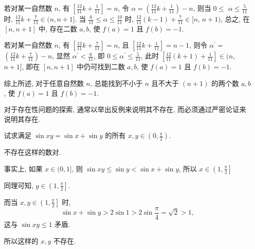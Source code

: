 \begin{solution}
	若对某一自然数 $n$, 有 $\left[\frac{12}{11} k+\frac{1}{11}\right]=n$, 令 $\alpha=\left(\frac{12}{11} k+\frac{1}{11}\right)-n$, 则当 $0 \leqslant$ $\alpha \leqslant \frac{5}{11}$ 时, $\frac{12}{11} k+\frac{7}{11} \in(n, n+1]$. 当 $\frac{6}{11} \leqslant \alpha \leqslant \frac{10}{11}$ 时, $\frac{12}{11}(k-1)+\frac{7}{11} \in[n$, $n+1)$, 总之, 在 $[n, n+1]$ 中, 存在二数 $a ,  b$, 使 $f(a)=1$ 且 $f(b)=-1$.

	若对某一自然数 $n$, 有 $\left[\frac{12}{11} k+\frac{7}{11}\right]=n$, 且 $\left[\frac{12}{11} k+\frac{1}{11}\right]=n-1$, 则令 $\alpha^{\prime}=$ $\left(\frac{12}{11} k+\frac{7}{11}\right)-n$, 显然 $\alpha^{\prime}<\frac{6}{11}$, 即 $0 \leqslant \alpha^{\prime} \leqslant \frac{5}{11}$, 此时 $\left[\frac{12}{11}(k+1)+\frac{1}{11}\right] \in(n$, $n+1]$, 即在 $[n, n+1]$ 中仍可找到二数 $a ,  b$, 使 $f(a)=1$ 且 $f(b)=-1$.

	综上所述, 对于任意自然数 $n$, 总能找到不小于 $n$ 且不大于 $(n+1)$ 的两个数 $a ,  b$, 使 $f(a)=1$ 且 $f(b)=-1$.
\end{solution}
\begin{note}
	对于存在性问题的探索, 通常以举出反例来说明其不存在, 而必须通过严密论证来说明其存在.
\end{note}

\begin{example}
	试求满足 $\sin x y=\sin x+\sin y$ 的所有 $x, y \in\left(0, \frac{\pi}{2}\right)$.
\end{example}
\begin{solution}
	不存在这样的数对.

	事实上, 如果 $x \in(0,1]$, 则 $\sin x y \leqslant \sin y<\sin x+\sin y$, 所以 $x \in\left(1, \frac{\pi}{2}\right]$

	同理可知, $y \in\left(1, \frac{\pi}{2}\right]$.

	而当 $x, y \in\left(1, \frac{\pi}{2}\right]$ 时,
	$$
		\sin x+\sin y>2 \sin 1>2 \sin \frac{\pi}{4}=\sqrt{2}>1,
	$$
	这与 $\sin x y \leqslant 1$ 矛盾.

	所以这样的 $x ,  y$ 不存在.
\end{solution}

